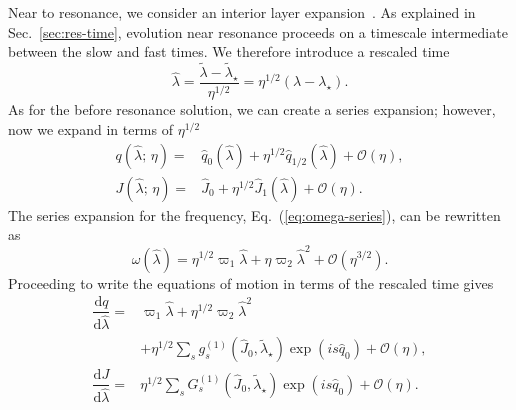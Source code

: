 \documentclass[aps,prd,amsfonts,amssymb,amsmath,nofootinbib,showpacs,superscriptaddress,twocolumn,floatfix]{revtex4-1}
\newcommand{\eqnref}[1]{Eq.~(\ref{eq:#1})}
\newcommand{\secref}[1]{Sec.~\ref{sec:#1}}
\newcommand{\dd}{\ensuremath{\mathrm{d}}}
\newcommand{\diff}[2]{\ensuremath{\dfrac{\dd {#1}}{\dd {#2}}}}
\newcommand{\order}[1]{\ensuremath{\mathcal{O}({#1})}}
\begin{document}
Near to resonance, we consider an interior layer expansion~\cite{Kevorkian1971}. As explained in \secref{res-time}, evolution near resonance proceeds on a timescale intermediate between the slow and fast times. We therefore introduce a rescaled time
\begin{equation}
\widehat{\lambda} = \dfrac{\widetilde{\lambda} - \widetilde{\lambda}_\star}{\eta^{1/2}} = \eta^{1/2}(\lambda - \lambda_\star).
\end{equation}
As for the before resonance solution, we can create a series expansion; however, now we expand in terms of $\eta^{1/2}$~\cite{Flanagan2012}
\begin{subequations}
\begin{align}
q\left(\widehat{\lambda};\,\eta\right) = {} & \widehat{q}_0\left(\widehat{\lambda}\right) + \eta^{1/2} \widehat{q}_{1/2}\left(\widehat{\lambda}\right) + \order{\eta}, \\
J\left(\widehat{\lambda};\,\eta\right) = {} & \widehat{J}_0 + \eta^{1/2} \widehat{J}_1\left(\widehat{\lambda}\right) + \order{\eta}.
\end{align}
\end{subequations}
The series expansion for the frequency, \eqnref{omega-series}, can be rewritten as
\begin{equation}
\omega\left(\widehat{\lambda}\right) = \eta^{1/2}\varpi_1\widehat{\lambda} + \eta\varpi_2\widehat{\lambda}^2 + \order{\eta^{3/2}}.
\label{eq:omega-hat}
\end{equation}
Proceeding to write the equations of motion in terms of the rescaled time gives
\begin{subequations}
\begin{align}
\diff{q}{\widehat{\lambda}} = {} & \varpi_1\widehat{\lambda} + \eta^{1/2}\varpi_2\widehat{\lambda}^2 \nonumber \\ 
 {} & + \left. \eta^{1/2}\sum_s g_s^{(1)}\left(\widehat{J}_0,\widetilde{\lambda}_\star\right)\exp(is \widehat{q}_0)  + \order{\eta}, \right. \\
\diff{J}{\widehat{\lambda}} = {} & \eta^{1/2}\sum_s G_s^{(1)}\left(\widehat{J}_0,\widetilde{\lambda}_\star\right)\exp(is \widehat{q}_0) + \order{\eta}.
\end{align}
\end{subequations}
\end{document}
